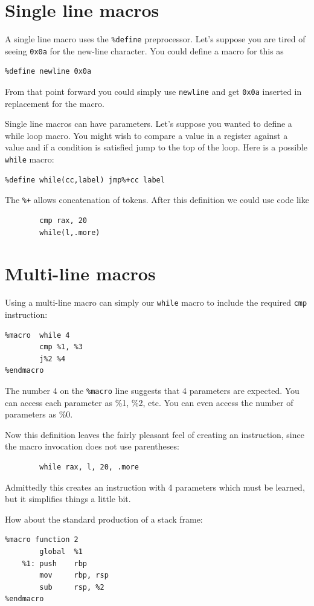 \documentclass[11pt,b5paper]{book}
\begin{document}
\section{Single line macros}

A single line macro uses the {\tt \%define} preprocessor.
Let's suppose you are tired of seeing {\tt 0x0a} for the new-line character.
You could define a macro for this as
\begin{verbatim}
%define newline 0x0a
\end{verbatim}
From that point forward you could simply use {\tt newline} and get {\tt 0x0a}
inserted in replacement for the macro.

Single line macros can have parameters.  
Let's suppose you wanted to define
a while loop macro.
You might wish to compare a value in a register against a value and if 
a condition is satisfied jump to the top of the loop.
Here is a possible {\tt while} macro:
\begin{verbatim}
%define while(cc,label) jmp%+cc label
\end{verbatim}
The {\tt \%+} allows concatenation of tokens.
After this definition we could use code like
\begin{verbatim}
        cmp rax, 20
        while(l,.more)
\end{verbatim}

\section{Multi-line macros}

Using a multi-line macro can simply our {\tt while} macro to include
the required {\tt cmp} instruction:
\begin{verbatim}
%macro  while 4
        cmp %1, %3
        j%2 %4
%endmacro
\end{verbatim}
The number 4 on the {\tt \%macro} line suggests that 4 parameters are
expected. You can access each parameter as \%1, \%2, etc.
You can even access the number of parameters as \%0.

Now this definition leaves the fairly pleasant feel of creating an
instruction, since the macro invocation does not use parentheses:
\begin{verbatim}
        while rax, l, 20, .more
\end{verbatim}
Admittedly this creates an instruction with 4 parameters which must be
learned, but it simplifies things a little bit.

How about the standard production of a stack frame:
\begin{verbatim}
%macro function 2
        global  %1
    %1: push    rbp
        mov     rbp, rsp
        sub     rsp, %2
%endmacro 
\end{verbatim}
\end{document}
